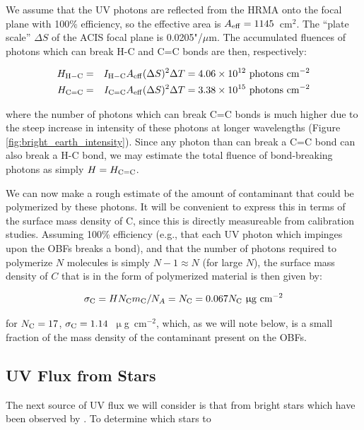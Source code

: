 \documentclass[11pt]{article}
\begin{document}
We assume that the UV photons are reflected from the HRMA onto the focal plane with 100\% efficiency,
so the effective area is $A_{\rm eff} = 1145$~cm$^2$. The ``plate scale'' $\Delta{S}$ of the ACIS focal plane is
0.0205"/$\mu$m. The accumulated fluences of photons which can break H-C and C=C bonds are then, respectively:

\begin{eqnarray}
H_{\rm H-C} &=& I_{\rm H-C}A_{\rm eff}(\Delta{S})^2\Delta{T} = 4.06 \times 10^{12}~{\rm photons~cm^{-2}} \\
H_{\rm C=C} &=& I_{\rm C=C}A_{\rm eff}(\Delta{S})^2\Delta{T} = 3.38 \times 10^{15}~{\rm photons~cm^{-2}}\label{eqn:fluence}
\end{eqnarray}

\noindent
where the number of photons which can break C=C bonds is much higher due to the steep increase in intensity of these
photons at longer wavelengths (Figure \ref{fig:bright_earth_intensity}). Since any photon than can break a C=C bond
can also break a H-C bond, we may estimate the total fluence of bond-breaking photons as simply $H = H_{\rm C=C}$.

We can now make a rough estimate of the amount of contaminant that could be polymerized by these photons. It will be
convenient to express this in terms of the surface mass density of C, since this is directly measureable from calibration
studies. Assuming 100\% efficiency (e.g., that each UV photon which impinges upon the OBFs breaks a bond), and that the number
of photons required to polymerize $N$ molecules is simply $N-1 \approx N$ (for large $N$), the surface mass density of
$C$ that is in the form of polymerized material is then given by:

\begin{equation}\label{eqn:pred_poly}
\sigma_{\rm C} = HN_{\rm C}m_{\rm C}/N_A = N_{\rm C} = 0.067N_{\rm C}~\upmu{\rm g~cm}^{-2}
\end{equation}

\noindent
for $N_{\rm C} = 17$, $\sigma_{\rm C} = 1.14$~$\upmu$g~cm$^{-2}$, which, as we will note below, is a small fraction of the mass density of the
contaminant present on the OBFs.

\subsection{UV Flux from Stars}

The next source of UV flux we will consider is that from bright stars which have been observed by \chandra. To determine which stars to
\end{document}
